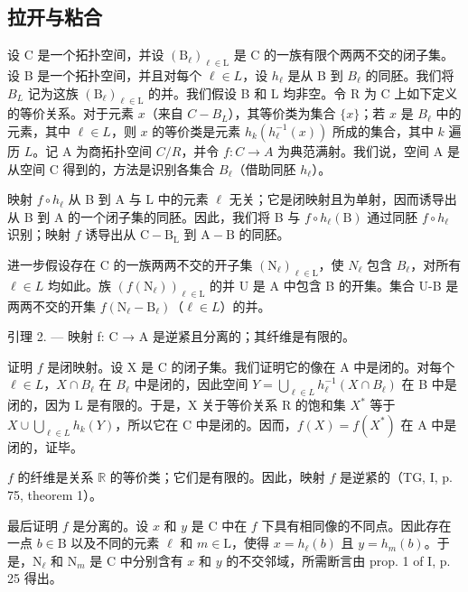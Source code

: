 \subsection{拉开与粘合}

设 C 是一个拓扑空间，并设 \((\mathrm{B}_{\ell})_{\ell\in\mathrm{L}}\) 是 C 的一族有限个两两不交的闭子集。设 B 是一个拓扑空间，并且对每个 \(\ell\in L\)，设 \(h_{\ell}\) 是从 B 到 \(B_{\ell}\) 的同胚。我们将 \(B_{L}\) 记为这族 \((\mathrm{B}_{\ell})_{\ell\in\mathrm{L}}\) 的并。我们假设 B 和 L 均非空。令 R 为 C 上如下定义的等价关系。对于元素 \(x\)（来自 \(C - B_L\)），其等价类为集合 \(\{x\}\)；若 \(x\) 是 \(B_\ell\) 中的元素，其中 \(\ell \in L\)，则 \(x\) 的等价类是元素 \(h_k(h_\ell^{-1}(x))\) 所成的集合，其中 \(k\) 遍历 \(L\)。记 A 为商拓扑空间 \(C/R\)，并令 \(f: C \to A\) 为典范满射。我们说，空间 A 是从空间 C 得到的，方法是识别各集合 \(B_\ell\)（借助同胚 \(h_\ell\)）。

映射 \(f \circ h_{\ell}\) 从 B 到 A 与 L 中的元素 \(\ell\) 无关；它是闭映射且为单射，因而诱导出从 B 到 A 的一个闭子集的同胚。因此，我们将 B 与 \(f \circ h_{\ell}(\mathrm{B})\) 通过同胚 \(f \circ h_{\ell}\) 识别；映射 \(f\) 诱导出从 \(\mathrm{C} - \mathrm{B}_{\mathrm{L}}\) 到 \(\mathrm{A} - \mathrm{B}\) 的同胚。

进一步假设存在 C 的一族两两不交的开子集 \((\mathrm{N}_{\ell})_{\ell\in\mathrm{L}}\)，使 \(N_{\ell}\) 包含 \(B_{\ell}\)，对所有 \(\ell\in L\) 均如此。族 \((f(\mathrm{N}_{\ell}))_{\ell\in\mathrm{L}}\) 的并 U 是 A 中包含 B 的开集。集合 U-B 是两两不交的开集 \(f(\mathrm{N}_{\ell}-\mathrm{B}_{\ell})\)（\(\ell\in L\)）的并。

引理 2. --- 映射 f: C → A 是逆紧且分离的；其纤维是有限的。

证明 \(f\) 是闭映射。设 X 是 C 的闭子集。我们证明它的像在 A 中是闭的。对每个 \(\ell \in L\)，\(X \cap B_{\ell}\) 在 \(B_{\ell}\) 中是闭的，因此空间 \(Y = \bigcup_{\ell \in L} h_{\ell}^{-1}(X \cap B_{\ell})\) 在 B 中是闭的，因为 L 是有限的。于是，X 关于等价关系 R 的饱和集 \(X^{*}\) 等于 \(X \cup \bigcup_{\ell \in L} h_{k}(Y)\)，所以它在 C 中是闭的。因而，\(f(X) = f(X^{*})\) 在 A 中是闭的，证毕。

\(f\) 的纤维是关系 \(\mathbb{R}\) 的等价类；它们是有限的。因此，映射 \(f\) 是逆紧的（TG, I, p. 75, theorem 1）。

最后证明 \(f\) 是分离的。设 \(x\) 和 \(y\) 是 C 中在 \(f\) 下具有相同像的不同点。因此存在一点 \(b \in \mathrm{B}\) 以及不同的元素 \(\ell\) 和 \(m \in \mathrm{L}\)，使得 \(x = h_{\ell}(b)\) 且 \(y = h_{m}(b)\)。于是，\(\mathrm{N}_{\ell}\) 和 \(\mathrm{N}_m\) 是 C 中分别含有 \(x\) 和 \(y\) 的不交邻域，所需断言由 prop. 1 of I, p. 25 得出。

